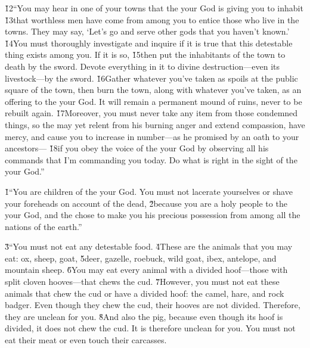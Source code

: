 \v{12}``You may hear in one of your towns that the  your God is giving you to inhabit \v{13}that worthless men have come from among you to entice those who live in the towns. They may say, `Let's go and serve other gods that you haven't known.' \v{14}You must thoroughly investigate and inquire if it is true that this detestable thing exists among you. If it is so, \v{15}then put the inhabitants of the town to death by the sword. Devote everything in it to divine destruction---even its livestock---by the sword. \v{16}Gather whatever you've taken as spoils at the public square of the town, then burn the town, along with whatever you've taken, as an offering to the  your God. It will remain a permanent mound of ruins, never to be rebuilt again. \v{17}Moreover, you must never take any item from those condemned things, so the  may yet relent from his burning anger and extend compassion, have mercy, and cause you to increase in number---as he promised by an oath to your ancestors--- \v{18}if you obey the voice of the  your God by observing all his commands that I'm commanding you today. Do what is right in the sight of the  your God.''

\v{1}``You are children of the  your God. You must not lacerate yourselves or shave your foreheads on account of the dead, \v{2}because you are a holy people to the  your God, and the  chose to make you his precious possession from among all the nations of the earth.''

\v{3}``You must not eat any detestable food. \v{4}These are the animals that you may eat: ox, sheep, goat, \v{5}deer, gazelle, roebuck, wild goat, ibex, antelope, and mountain sheep. \v{6}You may eat every animal with a divided hoof---those with split cloven hooves---that chews the cud. \v{7}However, you must not eat these animals that chew the cud or have a divided hoof: the camel, hare, and rock badger. Even though they chew the cud, their hooves are not divided. Therefore, they are unclean for you. \v{8}And also the pig, because even though its hoof is divided, it does not chew the cud. It is therefore unclean for you. You must not eat their meat or even touch their carcasses.

